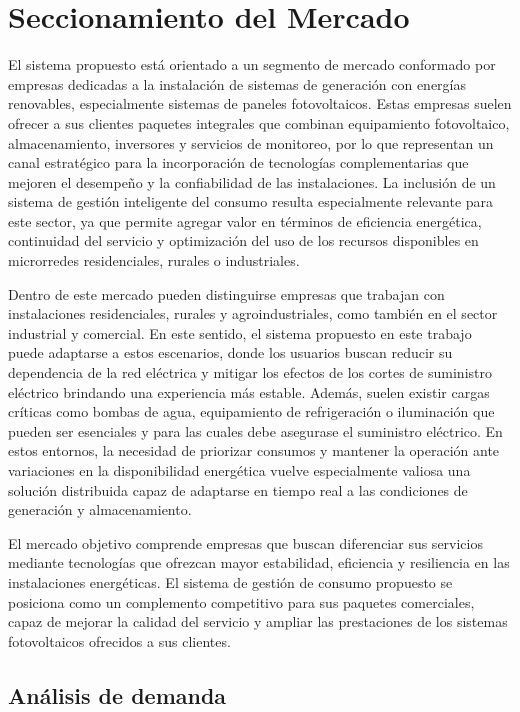 \section{Seccionamiento del Mercado}
El sistema propuesto está orientado a un segmento de mercado conformado por empresas dedicadas a la instalación de sistemas de generación con energías renovables, especialmente sistemas de paneles fotovoltaicos. Estas empresas suelen ofrecer a sus clientes paquetes integrales que combinan equipamiento fotovoltaico, almacenamiento, inversores y servicios de monitoreo, por lo que representan un canal estratégico para la incorporación de tecnologías complementarias que mejoren el desempeño y la confiabilidad de las instalaciones. La inclusión de un sistema de gestión inteligente del consumo resulta especialmente relevante para este sector, ya que permite agregar valor en términos de eficiencia energética, continuidad del servicio y optimización del uso de los recursos disponibles en microrredes residenciales, rurales o industriales.

Dentro de este mercado pueden distinguirse empresas que trabajan con instalaciones residenciales, rurales y agroindustriales, como también en el sector industrial y comercial. En este sentido, el sistema propuesto en este trabajo puede adaptarse a estos escenarios, donde los usuarios buscan reducir su dependencia de la red eléctrica y mitigar los efectos de los cortes de suministro eléctrico brindando una experiencia más estable. Además, suelen existir cargas críticas como bombas de agua, equipamiento de refrigeración o iluminación que pueden ser esenciales y para las cuales debe asegurase el suministro eléctrico. En estos entornos, la necesidad de priorizar consumos y mantener la operación ante variaciones en la disponibilidad energética vuelve especialmente valiosa una solución distribuida capaz de adaptarse en tiempo real a las condiciones de generación y almacenamiento.

El mercado objetivo comprende empresas que buscan diferenciar sus servicios mediante tecnologías que ofrezcan mayor estabilidad, eficiencia y resiliencia en las instalaciones energéticas. El sistema de gestión de consumo propuesto se posiciona como un complemento competitivo para sus paquetes comerciales, capaz de mejorar la calidad del servicio y ampliar las prestaciones de los sistemas fotovoltaicos ofrecidos a sus clientes.

\subsection{Análisis de demanda}

